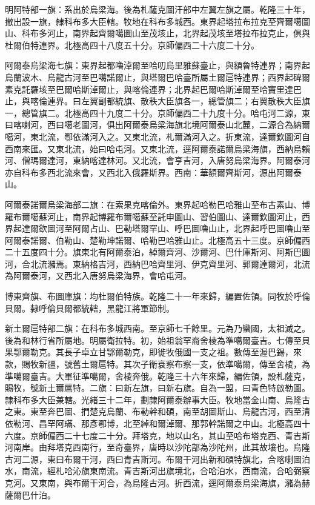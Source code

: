 \begin{pinyinscope}
明阿特部一旗：系出於烏梁海。後為札薩克圖汗部中左翼左旗之屬。乾隆三十年，撤出設一旗，隸科布多大臣轄。牧地在科布多城西。東界起塔拉布拉克至齊爾噶圖山、科布多河止，南界起齊爾噶圖山至茂垓止，北界起茂垓至塔拉布拉克止，俱與杜爾伯特連界。北極高四十八度五十分。京師偏西二十六度二十分。

阿爾泰烏梁海七旗：東界起都嚕淖爾至哈叨烏里雅蘇臺止，與額魯特連界；南界起烏蘭波木、烏龍古河至巴噶諾爾止，與塔爾巴哈臺所屬土爾扈特連界；西界起碑爾素克託羅垓至巴爾哈斯淖爾止，與喀倫連界；北界起巴爾哈斯淖爾至哈竇里達巴止，與喀倫連界。曰左翼副都統旗、散秩大臣旗各一，總管旗二；右翼散秩大臣旗一，總管旗二。北極高四十九度二十分。京師偏西二十九度十分。哈屯河二源，東曰喀喇河，西曰噶老圖河，俱出阿爾泰烏梁海旗北境阿爾泰山北麓，二源合為納爾噶河，東北流，鄂依滿河入之。又東北流，札爾滿河入之。折東流，達爾欽圖河自西南來匯。又東北流，始曰哈屯河。又東北流，逕阿爾泰諾爾烏梁海旗，西納烏賴河、僧瑪爾達河，東納喀達林河。又北流，會亨吉河，入唐努烏梁海界。阿爾泰河亦自科布多西北流來會，又西北入俄羅斯界。西南：華額爾齊斯河，源出阿爾泰山。

阿爾泰諾爾烏梁海部二旗：在索果克喀倫外。東界起哈勒巴哈雅山至布古素山、博羅布爾噶蘇河止，南界起博羅布爾噶蘇至託申圖山、習伯圖山、達爾欽圖河止，西界起達爾欽圖河至阿爾占山、巴勒塔爾罕山、呼巴圖嚕山止，北界起呼巴圖嚕山至阿爾泰諾爾、伯勒山、楚勒坤諾爾、哈勒巴哈雅山止。北極高五十三度。京師偏西二十五度四十分。旗東北有阿爾泰泊，綽爾齊河、沙爾河、巴什庫斯河、阿斯巴圖河，合北流瀦焉。東納格吉河，西納巴哈齊里河、伊克齊里河、郭爾達爾河，北流為阿爾泰河，又西北入唐努烏梁海界，會哈屯河。

博東齊旗、布圖庫旗：均杜爾伯特族。乾隆二十一年來歸，編置佐領。同牧於呼倫貝爾。隸呼倫貝爾都統轄，黑龍江將軍節制。

新土爾扈特部二旗：在科布多城西南。至京師七千餘里。元為乃蠻國，太祖滅之。後為和林行省所屬地。明屬衛拉特。初，始祖翁罕裔舍棱為準噶爾臺吉。七傳至貝果鄂爾勒克。其長子卓立甘鄂爾勒克，即徙牧俄國一支之祖。數傳至渥巴錫，來款，賜牧新疆，號舊土爾扈特。其次子衛袞察布察一支，依準噶爾，傳至舍棱，為準噶爾臺吉。大軍征準噶爾，舍棱奔俄。乾隆三十六年來歸，編佐領，設札薩克，賜牧，號新土爾扈特。二旗：曰新左旗，曰新右旗。自為一盟，曰青色特啟勒圖。隸科布多大臣兼轄。光緒三十二年，劃隸阿爾泰辦事大臣。牧地當金山南、烏隆古之東。東至奔巴圖、捫楚克烏蘭、布勒幹和碩，南至胡圖斯山、烏龍古河，西至清依勒河、昌罕阿璊、那彥鄂博，北至綽和爾淖爾、那郭幹諾爾之中山。北極高四十六度。京師偏西二十七度二十分。拜塔克，地以山名，其山至哈布塔克西、青吉斯河南岸。由拜塔克西南行，至奇臺界，唐時以沙陀部為沙陀州，此其故壤也。烏隆古河二源，東曰布爾干河，西曰青吉斯河。布爾干河出新和碩特旗北，合喀喇圖泊水，南流，經札哈沁旗東南流。青吉斯河出旗境北，合哈泊水，西南流，合哈弼察克河。又東南，與布爾干河合，為烏隆古河。折西流，逕阿爾泰烏梁海旗，瀦為赫薩爾巴什泊。


\end{pinyinscope}
